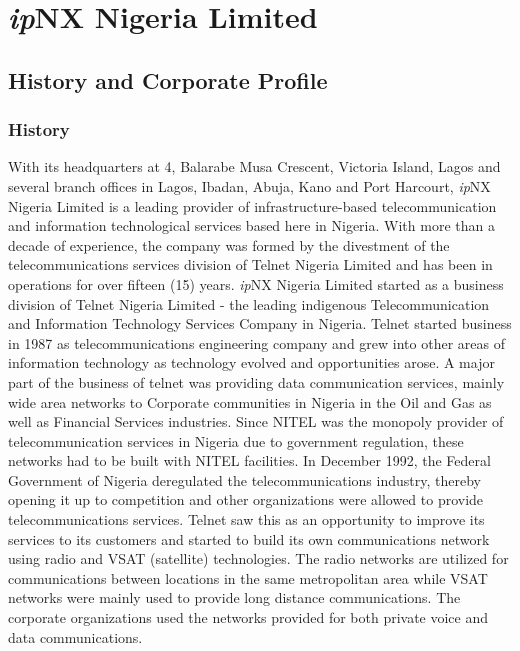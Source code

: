 \chapter{\textit{ip}NX Nigeria Limited}

\section{History and Corporate Profile}
\subsection{History}
With its headquarters at 4, Balarabe Musa
Crescent, Victoria Island, Lagos and several branch offices in Lagos, Ibadan, Abuja, Kano and Port Harcourt, \textit{ip}NX Nigeria Limited is a leading
provider of infrastructure-based telecommunication and information technological services based
here in Nigeria. With more than a decade of experience, the company was formed by the
divestment of the telecommunications services division of Telnet Nigeria Limited and has been in
operations for over fifteen (15) years.
\textit{ip}NX Nigeria Limited started as a business division of Telnet Nigeria Limited - the leading
indigenous Telecommunication and Information Technology Services Company in Nigeria. Telnet
started business in 1987 as telecommunications engineering company and grew into other areas of
information technology as technology evolved and opportunities arose. A major part of the
business of telnet was providing data communication services, mainly wide area networks to
Corporate communities in Nigeria in the Oil and Gas as well as Financial Services industries. Since
NITEL was the monopoly provider of telecommunication services in Nigeria due to government
regulation, these networks had to be built with NITEL facilities.
In December 1992, the Federal Government of Nigeria deregulated the
telecommunications industry, thereby opening it up to competition and other organizations were
allowed to provide telecommunications services. Telnet saw this as an opportunity to improve its
services to its customers and started to build its own communications network using radio and
VSAT (satellite) technologies.
The radio networks are utilized for communications between locations in the same
metropolitan area while VSAT networks were mainly used to provide long distance communications. The corporate organizations used the networks provided for both private voice and data communications.\\

